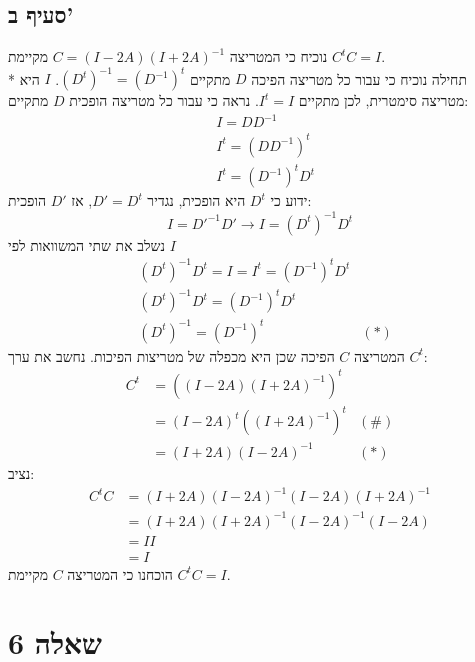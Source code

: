 \documentclass[a4paper, 10pt]{article}
\begin{document}
\begin{hebrew}
	\subsection{סעיף ב'}
	נוכיח כי המטריצה $C = {(I-2A)(I+2A)}^{-1}$
	מקיימת $C^t C = I$. \\*
	תחילה נוכיח כי עבור כל מטריצה הפיכה $D$ מתקיים
	${(D^t)}^{-1} = {(D^{-1})}^t$.
	$I$ היא מטריצה סימטרית, לכן מתקיים $I^t = I$.
	נראה כי עבור כל מטריצה הופכית $D$ מתקיים:
	\[
		\begin{aligned}
			& I = D D^{-1} \\
			& I^t = {(DD^{-1})}^t \\
			& I^t = {(D^{-1})}^t D^t
		\end{aligned}
	\]
	ידוע כי $D^t$ היא הופכית, נגדיר $D' = D^t$, אז $D'$ הופכית:
	\[
		I = D'^{-1} D' \rightarrow
		I = {(D^t)}^{-1} D^t
	\]
	נשלב את שתי המשוואות לפי $I$
	\[
		\begin{aligned}
			& {(D^t)}^{-1} D^t = I = I^t = {(D^{-1})}^t D^t \\
			& {(D^t)}^{-1} D^t = {(D^{-1})}^t D^t \\
			& {(D^t)}^{-1} = {(D^{-1})}^t & (*)
		\end{aligned}
	\]
	המטריצה $C$ הפיכה שכן היא מכפלה של מטריצות הפיכות. נחשב את ערך $C^t$:
	\[
		\begin{aligned}
			C^t & = {((I-2A){(I+2A)}^{-1})}^t \\
			& = {(I-2A)}^t {({(I+2A)}^{-1})}^t & (\#) \\
			& = (I+2A){(I-2A)}^{-1} & (*)
		\end{aligned}
	\]
	נציב:
	\[
		\begin{aligned}
			C^t C & = (I+2A){(I-2A)}^{-1} (I-2A){(I+2A)}^{-1} \\
			& = (I+2A){(I+2A)}^{-1} {(I-2A)}^{-1} (I-2A) \\
			& = II \\
			& = I
		\end{aligned}
	\]
	הוכחנו כי המטריצה $C$ מקיימת $C^t C = I$.

	\section{שאלה 6}

\end{hebrew}
\end{document}
